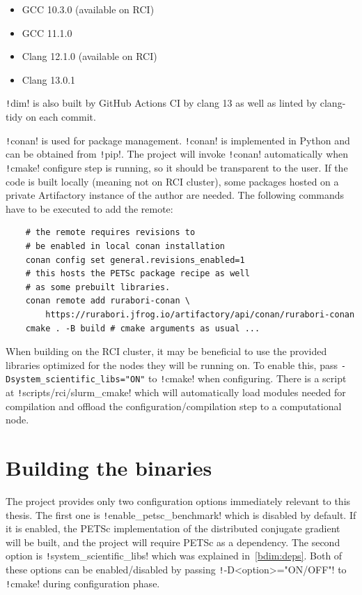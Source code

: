 \documentclass[thesis=M,english]{FITthesis}[2019/12/23]
\newcommand{\csre}[1]{\texttt!#1!}
\begin{document}
\begin{itemize}
    \item GCC 10.3.0 (available on RCI)
    \item GCC 11.1.0
    \item Clang 12.1.0 (available on RCI)
    \item Clang 13.0.1
\end{itemize}
\csre{dim} is also built by GitHub Actions CI by clang 13 as well as linted by clang-tidy on each commit.

\csre{conan} is used for package management. \csre{conan} is implemented in Python and can be
obtained from \csre{pip}. The project will invoke \csre{conan} automatically when \csre{cmake} configure step
is running, so it should be transparent to the user. If the code is built locally (meaning not on RCI cluster),
some packages hosted on a private Artifactory instance of the author are needed. The following commands
have to be executed to add the remote:

\begin{verbatim}
    # the remote requires revisions to 
    # be enabled in local conan installation
    conan config set general.revisions_enabled=1
    # this hosts the PETSc package recipe as well
    # as some prebuilt libraries.
    conan remote add rurabori-conan \
        https://rurabori.jfrog.io/artifactory/api/conan/rurabori-conan
    cmake . -B build # cmake arguments as usual ...
\end{verbatim}

When building on the RCI cluster, it may be beneficial
to use the provided libraries optimized for the nodes they will be running on. To enable this,
pass \texttt{-Dsystem_scientific_libs="ON"} to \csre{cmake} when configuring. There is a script
at \csre{scripts/rci/slurm_cmake} which will automatically load modules needed for compilation and offload
the configuration/compilation step to a computational node.

\section{Building the binaries}

The project provides only two configuration options immediately relevant to this thesis. The
first one is \csre{enable_petsc_benchmark} which is disabled by default. If it is enabled,
the PETSc implementation of the distributed conjugate gradient will be built, and the project
will require PETSc as a dependency. The second option is \csre{system_scientific_libs} which
was explained in~\ref{bdim:deps}. Both of these options can be enabled/disabled by passing
\csre{-D<option>="ON/OFF"} to \csre{cmake} during configuration phase.
\end{document}
